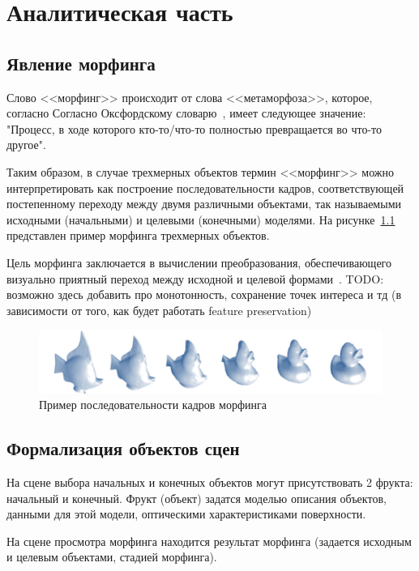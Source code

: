 \chapter{Аналитическая часть}


\section{Явление морфинга}
Слово <<морфинг>> происходит от слова <<метаморфоза>>, которое, согласно
Согласно Оксфордскому словарю~\cite{oxford_dictionary}, имеет следующее значение: "Процесс, в ходе которого кто-то/что-то полностью превращается во что-то другое".

Таким образом, в случае трехмерных объектов термин <<морфинг>> можно интерпретировать как построение последовательности кадров, соответствующей постепенному переходу между двумя различными
объектами, так называемыми исходными (начальными) и целевыми (конечными) моделями. На рисунке~\ref{fig:morhping_example} представлен пример морфинга трехмерных объектов.

Цель морфинга заключается в вычислении преобразования, обеспечивающего визуально приятный переход между исходной и целевой формами~\cite{mocanu}. TODO: возможно здесь добавить про монотонность, сохранение точек интереса и тд (в зависимости от того, как будет работать feature preservation)

\begin{figure}[H]
    \centering
    \includegraphics[width=\textwidth]{../inc/images/morhping_sequence}
    \caption{Пример последовательности кадров морфинга}
    \label{fig:morhping_example}
\end{figure}


\section{Формализация объектов сцен}

На сцене выбора начальных и конечных объектов могут присутствовать 2 фрукта: начальный и конечный. Фрукт (объект) задатся моделью описания объектов, данными для этой модели, оптическими характеристиками поверхности.

На сцене просмотра морфинга находится результат морфинга (задается исходным и целевым объектами, стадией морфинга).

